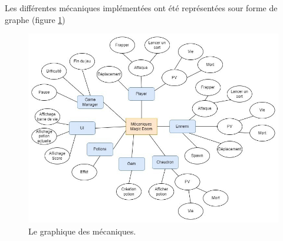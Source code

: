 Les différentes mécaniques implémentées ont été représentées sour forme de graphe (figure \ref{fig:mecanique})

\FloatBarrier
\begin{figure}[!ht]
    \includegraphics[width=\textwidth]{image/mecaniques.jpeg}
    \caption{Le graphique des mécaniques.}
    \label{fig:mecanique}
\end{figure}
